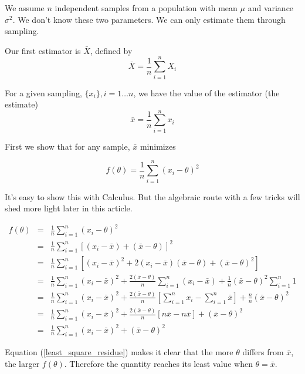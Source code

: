 \documentclass[]{article}
\begin{document}
We assume $n$ independent samples from a population with
mean $\mu$ and variance $\sigma^2$.  We don't know these
two parameters.  We can only estimate them through sampling.

Our first estimator is $\bar{X}$, defined by
\begin{equation}
\bar{X} = \frac{1}{n} \sum_{i=1}^n X_i
\end{equation}

For a given sampling, $\{x_i\}, i=1 \ldots n$, we have the
value of the estimator (the estimate)
$$
\bar{x} = \frac{1}{n} \sum_{i=1}^n x_i
$$

First we show that for any sample, $\bar{x}$ minimizes

\begin{equation} \label{least_squares}
f(\theta) = \frac{1}{n} \sum_{i=1}^n (x_i - \theta)^2
\end{equation}

It's easy to show this with Calculus.  But the algebraic
route with a few tricks will shed more light later in
this article.

\begin{eqnarray}
f(\theta) &= &\frac{1}{n} \sum_{i=1}^n (x_i - \theta)^2 \nonumber \\
  &= &\frac{1}{n} \sum_{i=1}^n \left[ (x_i - \bar{x}) + (\bar{x} - \theta)\right]^2 \nonumber \\
  &= &\frac{1}{n} \sum_{i=1}^n \left[ (x_i - \bar{x})^2 + 2 (x_i-\bar{x})(\bar{x} - \theta) + (\bar{x} - \theta)^2 \right] \nonumber \\
  &= &\frac{1}{n} \sum_{i=1}^n (x_i - \bar{x})^2 + 
     \frac{2(\bar{x} - \theta)}{n} \sum_{i=1}^n (x_i - \bar{x}) +
     \frac{1}{n} (\bar{x} - \theta)^2 \sum_{i=1}^n 1 \nonumber \\
  &= &\frac{1}{n} \sum_{i=1}^n (x_i - \bar{x})^2 + 
     \frac{2(\bar{x} - \theta)}{n} \left[ \sum_{i=1}^n x_i - \sum_{i=1}^n  \bar{x} \right]  +
     \frac{n}{n} (\bar{x} - \theta)^2 \nonumber \\
  &= &\frac{1}{n} \sum_{i=1}^n (x_i - \bar{x})^2 + 
     \frac{2(\bar{x} - \theta)}{n} \left[ n \bar{x} - n \bar{x} \right]  +
     (\bar{x} - \theta)^2 \nonumber \\
  &= &\frac{1}{n} \sum_{i=1}^n (x_i - \bar{x})^2 + 
     (\bar{x} - \theta)^2 \label{least_square_residue}
\end{eqnarray}

Equation (\ref{least_square_residue}) makes it clear that
the more $\theta$ differs from $\bar{x}$, the larger $f(\theta)$.
Therefore the quantity reaches its least value
when $\theta = \bar{x}$.
\end{document}
